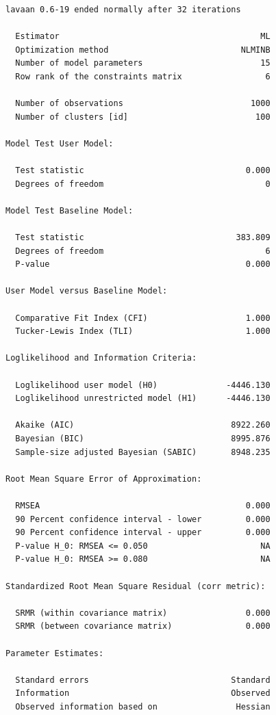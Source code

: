 \documentclass[
  letterpaper,
  DIV=11,
  numbers=noendperiod]{scrreprt}
\begin{document}
\begin{verbatim}
lavaan 0.6-19 ended normally after 32 iterations

  Estimator                                         ML
  Optimization method                           NLMINB
  Number of model parameters                        15
  Row rank of the constraints matrix                 6

  Number of observations                          1000
  Number of clusters [id]                          100

Model Test User Model:
                                                      
  Test statistic                                 0.000
  Degrees of freedom                                 0

Model Test Baseline Model:

  Test statistic                               383.809
  Degrees of freedom                                 6
  P-value                                        0.000

User Model versus Baseline Model:

  Comparative Fit Index (CFI)                    1.000
  Tucker-Lewis Index (TLI)                       1.000

Loglikelihood and Information Criteria:

  Loglikelihood user model (H0)              -4446.130
  Loglikelihood unrestricted model (H1)      -4446.130
                                                      
  Akaike (AIC)                                8922.260
  Bayesian (BIC)                              8995.876
  Sample-size adjusted Bayesian (SABIC)       8948.235

Root Mean Square Error of Approximation:

  RMSEA                                          0.000
  90 Percent confidence interval - lower         0.000
  90 Percent confidence interval - upper         0.000
  P-value H_0: RMSEA <= 0.050                       NA
  P-value H_0: RMSEA >= 0.080                       NA

Standardized Root Mean Square Residual (corr metric):

  SRMR (within covariance matrix)                0.000
  SRMR (between covariance matrix)               0.000

Parameter Estimates:

  Standard errors                             Standard
  Information                                 Observed
  Observed information based on                Hessian



\end{verbatim}
\end{document}
